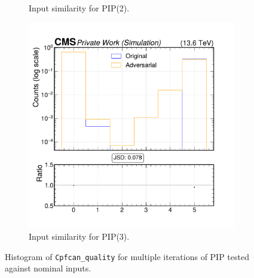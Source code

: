 \begin{figure}[h]
\begin{subfigure}[t]{0.32\textwidth}
    \caption{Input similarity for PIP(2).}
  \end{subfigure}\hfill
  \begin{subfigure}[t]{0.32\textwidth}
    \includegraphics[width=\linewidth]{media/output/features/compare/intprob_3/cmp_cpf_arr_Cpfcan_quality.pdf}
    \caption{Input similarity for PIP(3).}
  \end{subfigure}

  \caption{Histogram of \texttt{Cpfcan\_quality} for multiple iterations of PIP tested against nominal inputs.}
  \label{fig:intprob_input_Cpfcan_quality}
\end{figure}
